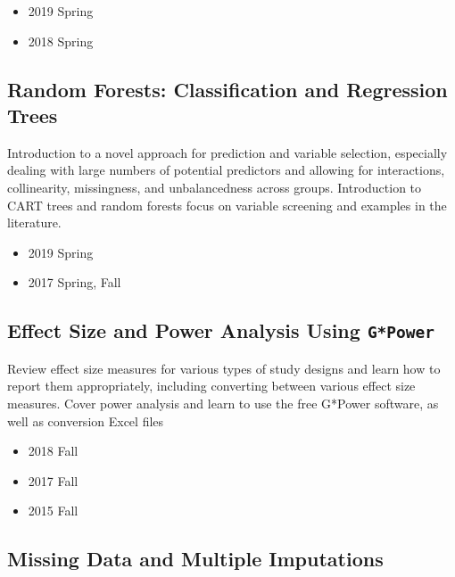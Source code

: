 \documentclass[11pt,a4paper,]{moderncv}
\providecommand{\tightlist}{%
	\setlength{\itemsep}{0pt}\setlength{\parskip}{0pt}}
\begin{document}
\begin{itemize}
\tightlist
\item
  2019 Spring
\item
  2018 Spring
\end{itemize}

\hypertarget{random-forests-classification-and-regression-trees}{%
\subsection{Random Forests: Classification and Regression
Trees}\label{random-forests-classification-and-regression-trees}}

Introduction to a novel approach for prediction and variable selection,
especially dealing with large numbers of potential predictors and
allowing for interactions, collinearity, missingness, and unbalancedness
across groups. Introduction to CART trees and random forests focus on
variable screening and examples in the literature.

\begin{itemize}
\tightlist
\item
  2019 Spring
\item
  2017 Spring, Fall
\end{itemize}

\hypertarget{effect-size-and-power-analysis-using-gpower}{%
\subsection{\texorpdfstring{Effect Size and Power Analysis Using
\texttt{G*Power}}{Effect Size and Power Analysis Using G*Power}}\label{effect-size-and-power-analysis-using-gpower}}

Review effect size measures for various types of study designs and learn
how to report them appropriately, including converting between various
effect size measures. Cover power analysis and learn to use the free
G*Power software, as well as conversion Excel files

\begin{itemize}
\tightlist
\item
  2018 Fall
\item
  2017 Fall
\item
  2015 Fall
\end{itemize}

\hypertarget{missing-data-and-multiple-imputations}{%
\subsection{Missing Data and Multiple
Imputations}\label{missing-data-and-multiple-imputations}}
\end{document}

